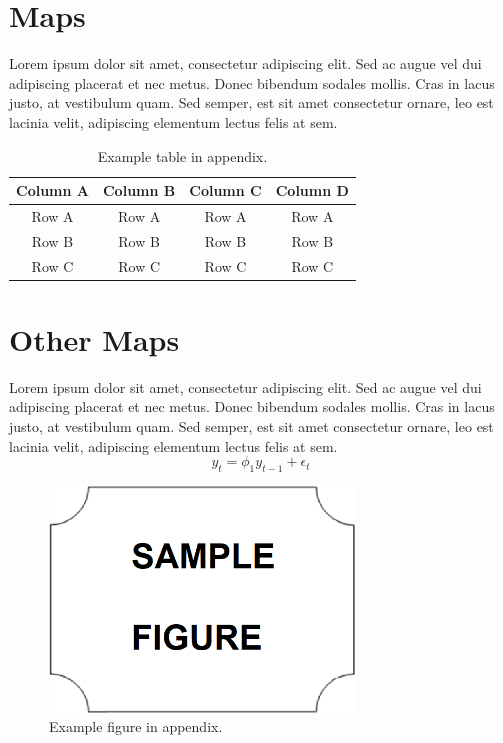 
\chapter{Maps}

Lorem ipsum dolor sit amet, consectetur adipiscing elit. Sed ac augue vel dui 
adipiscing placerat et nec metus. Donec bibendum sodales mollis. Cras in lacus 
justo, at vestibulum quam. Sed semper, est sit amet consectetur ornare, leo est 
lacinia velit, adipiscing elementum lectus felis at sem.

\vspace{3pt}
\begin{table}[ht]
\centering
\setlength{\tabcolsep}{14pt}
\caption{Example table in appendix.}
\begin{tabular}{cccc}
\toprule\midrule
Column A & Column B & Column C & Column D \\
\hline
Row A & Row A & Row A & Row A \\
Row B & Row B & Row B & Row B \\
Row C & Row C & Row C & Row C \\
\bottomrule
\end{tabular}
\label{table:appendix}
\end{table}
\vspace{-6pt}

\chapter{Other Maps}

Lorem ipsum dolor sit amet, consectetur adipiscing elit. Sed ac augue vel dui 
adipiscing placerat et nec metus. Donec bibendum sodales mollis. Cras in lacus 
justo, at vestibulum quam. Sed semper, est sit amet consectetur ornare, leo est 
lacinia velit, adipiscing elementum lectus felis at sem.
%
\begin{equation}
    y_{t} = \phi_{1} y_{t-1} + \epsilon_{t}
\label{eq:appendix}
\end{equation}

\begin{figure}[ht]
    \centering
    \includegraphics[width=230pt,keepaspectratio=true]{./fig/sekil7}
    \caption{Example figure in appendix.}
    \label{fig:appendix}
\end{figure}
\vspace{-6pt}
    






